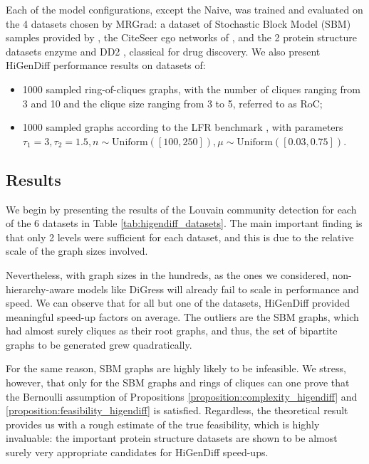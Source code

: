 Each of the model configurations, except the Naive, was trained and evaluated on the 4 datasets chosen by MRGrad: a dataset of Stochastic Block Model (SBM) samples provided by \cite{martinkus_spectre_2022}, the CiteSeer ego networks of \cite{sen_collective_2008}, and the 2 protein structure datasets enzyme \cite{schomburg_brenda_2004} and DD2 \cite{dobson_distinguishing_2003}, classical for drug discovery. We also present HiGenDiff performance results on datasets of:
\begin{itemize}
    \item 1000 sampled ring-of-cliques graphs, with the number of cliques ranging from 3 and 10 and the clique size ranging from 3 to 5, referred to as RoC;
    \item 1000 sampled graphs according to the LFR benchmark \cite{lancichinetti_finding_2011}, with parameters $\tau_1=3, \tau_2=1.5, n \sim \text{Uniform}([100, 250]), \mu \sim \text{Uniform}([0.03, 0.75])$.
\end{itemize}

\subsection{Results}

We begin by presenting the results of the Louvain community detection for each of the 6 datasets in Table \ref{tab:higendiff_datasets}. The main important finding is that only 2 levels were sufficient for each dataset, and this is due to the relative scale of the graph sizes involved. 

Nevertheless, with graph sizes in the hundreds, as the ones we considered, non-hierarchy-aware models like DiGress will already fail to scale in performance and speed. We can observe that for all but one of the datasets, HiGenDiff provided meaningful speed-up factors on average. The outliers are the SBM graphs, which had almost surely cliques as their root graphs, and thus, the set of bipartite graphs to be generated grew quadratically.

For the same reason, SBM graphs are highly likely to be infeasible. We stress, however, that only for the SBM graphs and rings of cliques can one prove that the Bernoulli assumption of Propositions \ref{proposition:complexity_higendiff} and \ref{proposition:feasibility_higendiff} is satisfied. Regardless, the theoretical result provides us with a rough estimate of the true feasibility, which is highly invaluable: the important protein structure datasets are shown to be almost surely very appropriate candidates for HiGenDiff speed-ups.

